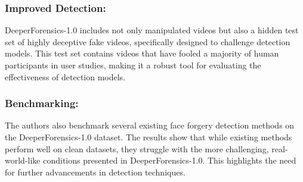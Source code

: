 \documentclass{report}
\begin{document}
	\subsection{Improved Detection:}
	DeeperForensics-1.0 includes not only manipulated videos but also a hidden test set of highly deceptive fake videos, specifically designed to challenge detection models. This test set contains videos that have fooled a majority of human participants in user studies, making it a robust tool for evaluating the effectiveness of detection models.
	
	\subsection{Benchmarking:}
	The authors also benchmark several existing face forgery detection methods on the DeeperForensics-1.0 dataset. The results show that while existing methods perform well on clean datasets, they struggle with the more challenging, real-world-like conditions presented in DeeperForensics-1.0. This highlights the need for further advancements in detection techniques.
	
	
	
	
	
	
	
	
	
	\chapter{}
	
	
	
	
	
	
	
	
	
	
	
	\newpage
	
	
	
\end{document}
